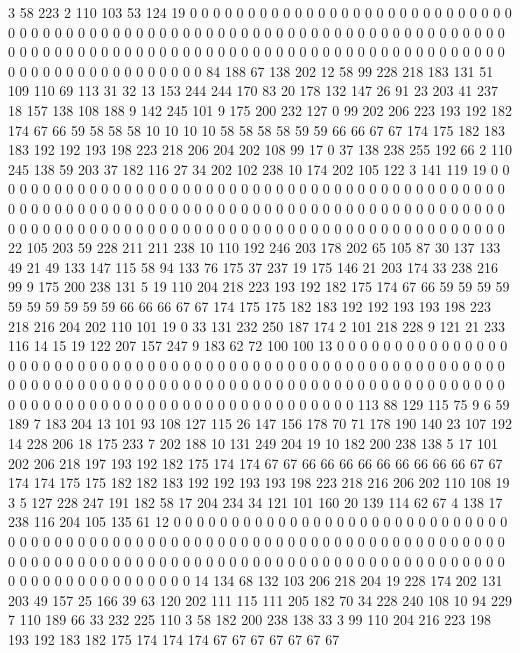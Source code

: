 3 58 223 2 110 103 53 124 19 0 0 0 0 0 0 0 0 0 0 0
0 0 0 0 0 0 0 0 0 0 0 0 0 0 0 0 0 0 0 0
0 0 0 0 0 0 0 0 0 0 0 0 0 0 0 0 0 0 0 0
0 0 0 0 0 0 0 0 0 0 0 0 0 0 0 0 0 0 0 0
0 0 0 0 0 0 0 0 0 0 0 0 0 0 0 0 0 0 0 0
0 0 0 0 0 0 0 0 0 0 0 0 0 0 0 0 0 0 0 0
0 0 0 0 0 0 0 0 0 0 0 0 0 0 0 0 0 0 0 0
84 188 67 138 202 12 58 99 228 218 183 131 51 109 110 69 113 31 32 13
153 244 244 170 83 20 178 132 147 26 91 23 203 41 237 18 157 138 108 188
9 142 245 101 9 175 200 232 127 0 99 202 206 223 193 192 182 174 67 66
59 58 58 58 10 10 10 10 58 58 58 58 59 59 66 66 67 67 174 175
182 183 183 192 192 193 198 223 218 206 204 202 108 99 17 0 37 138 238 255
192 66 2 110 245 138 59 203 37 182 116 27 34 202 102 238 10 174 202 105
122 3 141 119 19 0 0 0 0 0 0 0 0 0 0 0 0 0 0 0
0 0 0 0 0 0 0 0 0 0 0 0 0 0 0 0 0 0 0 0
0 0 0 0 0 0 0 0 0 0 0 0 0 0 0 0 0 0 0 0
0 0 0 0 0 0 0 0 0 0 0 0 0 0 0 0 0 0 0 0
0 0 0 0 0 0 0 0 0 0 0 0 0 0 0 0 0 0 0 0
0 0 0 0 0 0 0 0 0 0 0 0 0 0 0 0 0 0 0 0
0 0 0 0 0 0 0 0 0 0 0 0 0 0 0 0 22 105 203 59
228 211 211 238 10 110 192 246 203 178 202 65 105 87 30 137 133 49 21 49
133 147 115 58 94 133 76 175 37 237 19 175 146 21 203 174 33 238 216 99
9 175 200 238 131 5 19 110 204 218 223 193 192 182 175 174 67 66 59 59
59 59 59 59 59 59 59 59 66 66 66 67 67 174 175 175 182 183 192 192
193 193 198 223 218 216 204 202 110 101 19 0 33 131 232 250 187 174 2 101
218 228 9 121 21 233 116 14 15 19 122 207 157 247 9 183 62 72 100 100
13 0 0 0 0 0 0 0 0 0 0 0 0 0 0 0 0 0 0 0
0 0 0 0 0 0 0 0 0 0 0 0 0 0 0 0 0 0 0 0
0 0 0 0 0 0 0 0 0 0 0 0 0 0 0 0 0 0 0 0
0 0 0 0 0 0 0 0 0 0 0 0 0 0 0 0 0 0 0 0
0 0 0 0 0 0 0 0 0 0 0 0 0 0 0 0 0 0 0 0
0 0 0 0 0 0 0 0 0 0 0 0 0 0 0 0 0 0 0 0
0 0 0 0 0 0 0 0 0 0 0 0 113 88 129 115 75 9 6 59
189 7 183 204 13 101 93 108 127 115 26 147 156 178 70 71 178 190 140 23
107 192 14 228 206 18 175 233 7 202 188 10 131 249 204 19 10 182 200 238
138 5 17 101 202 206 218 197 193 192 182 175 174 174 67 67 66 66 66 66
66 66 66 66 66 67 67 174 174 175 175 182 182 183 192 192 193 193 198 223
218 216 206 202 110 108 19 3 5 127 228 247 191 182 58 17 204 234 34 121
101 160 20 139 114 62 67 4 138 17 238 116 204 105 135 61 12 0 0 0
0 0 0 0 0 0 0 0 0 0 0 0 0 0 0 0 0 0 0 0
0 0 0 0 0 0 0 0 0 0 0 0 0 0 0 0 0 0 0 0
0 0 0 0 0 0 0 0 0 0 0 0 0 0 0 0 0 0 0 0
0 0 0 0 0 0 0 0 0 0 0 0 0 0 0 0 0 0 0 0
0 0 0 0 0 0 0 0 0 0 0 0 0 0 0 0 0 0 0 0
0 0 0 0 0 0 0 0 0 0 0 0 0 0 0 0 0 0 0 0
0 0 0 0 0 0 0 0 14 134 68 132 103 206 218 204 19 228 174 202
131 203 49 157 25 166 39 63 120 202 111 115 111 205 182 70 34 228 240 108
10 94 229 7 110 189 66 33 232 225 110 3 58 182 200 238 138 33 3 99
110 204 216 223 198 193 192 183 182 175 174 174 174 67 67 67 67 67 67 67
